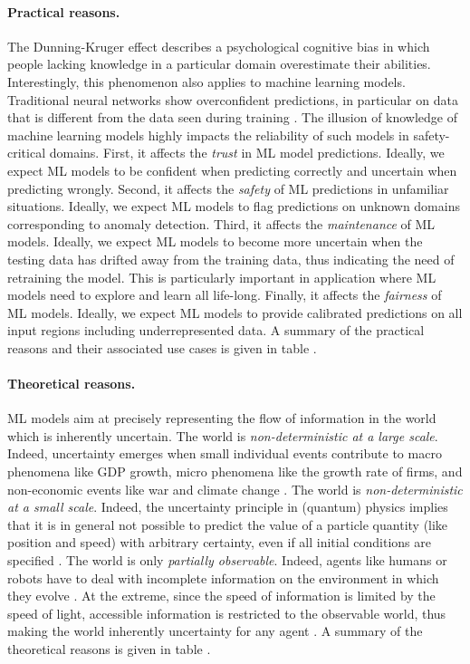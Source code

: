 \paragraph*{Practical reasons.} The Dunning-Kruger effect \cite{dunning-kruger} describes a psychological cognitive bias in which people lacking knowledge in a particular domain overestimate their abilities. Interestingly, this phenomenon also applies to machine learning models. Traditional neural networks show overconfident predictions, in particular on data that is different from the data seen during training \cite{overconfident-relu}. The illusion of knowledge of machine learning models highly impacts the reliability of such  models  in  safety-critical  domains.
First, it affects the \emph{trust} in ML model predictions. Ideally, we expect ML models to be confident when predicting correctly and uncertain when predicting wrongly. 
Second, it affects the \emph{safety} of ML predictions in unfamiliar situations. Ideally, we expect ML models to flag predictions on unknown domains corresponding to anomaly detection.
Third, it affects the \emph{maintenance} of ML models. Ideally, we expect ML models to become more uncertain when the testing data has drifted away from the training data, thus indicating the need of retraining the model. This is particularly important in application where ML models need to explore and learn all life-long.
Finally, it affects the \emph{fairness} of ML models. Ideally, we expect ML models to provide calibrated predictions on all input regions including underrepresented data.
A summary of the practical reasons and their associated use cases is given in table .

\paragraph*{Theoretical reasons.} ML models aim at precisely representing the flow of information in the world which is inherently uncertain.
The world is \emph{non-deterministic at a large scale}. Indeed, uncertainty emerges when small individual events contribute to macro phenomena like GDP growth, micro phenomena like the growth rate of firms, and non-economic events like war and climate change \cite{macro-micro-uncertainty}.
The world is \emph{non-deterministic at a small scale}. Indeed, the uncertainty principle in (quantum) physics implies that it is in general not possible to predict the value of a particle quantity (like position and speed) with arbitrary certainty, even if all initial conditions are specified \cite{hilgevoord2016heisenberg}.
The world is only \emph{partially observable}. Indeed, agents like humans or robots have to deal with incomplete information on the environment in which they evolve \cite{kaelbling1998pomdp}. At the extreme, since the speed of information is limited by the speed of light, accessible information is restricted to the observable world, thus making the world inherently uncertainty for any agent \cite{ord2021universe}.
A summary of the theoretical reasons is given in table .


